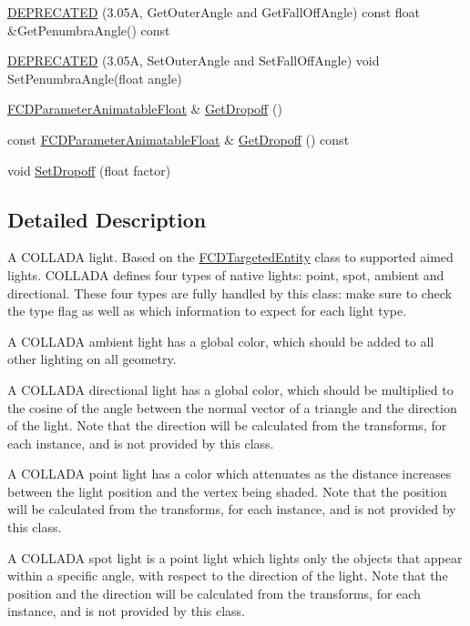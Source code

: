 \begin{DoxyCompactItemize}
\item 
\hyperlink{classFCDLight_a95d4f8b8d9b8f7d177405d1139ab346b}{DEPRECATED} (3.05A, GetOuterAngle and GetFallOffAngle) const float \&GetPenumbraAngle() const 
\item 
\hyperlink{classFCDLight_ad69a3aca5f0962c52c75d65bf51f55a5}{DEPRECATED} (3.05A, SetOuterAngle and SetFallOffAngle) void SetPenumbraAngle(float angle)
\item 
\hyperlink{classFCDParameterAnimatableT}{FCDParameterAnimatableFloat} \& \hyperlink{classFCDLight_ae532074b29738e69ef8e0bc73de993ad}{GetDropoff} ()
\item 
const \hyperlink{classFCDParameterAnimatableT}{FCDParameterAnimatableFloat} \& \hyperlink{classFCDLight_a11ea9829880b669586fde18745710649}{GetDropoff} () const 
\item 
void \hyperlink{classFCDLight_a78e8a5e5465c92226c41cc93e22652da}{SetDropoff} (float factor)
\end{DoxyCompactItemize}


\subsection{Detailed Description}
A COLLADA light. Based on the \hyperlink{classFCDTargetedEntity}{FCDTargetedEntity} class to supported aimed lights. COLLADA defines four types of native lights: point, spot, ambient and directional. These four types are fully handled by this class: make sure to check the type flag as well as which information to expect for each light type.

A COLLADA ambient light has a global color, which should be added to all other lighting on all geometry.

A COLLADA directional light has a global color, which should be multiplied to the cosine of the angle between the normal vector of a triangle and the direction of the light. Note that the direction will be calculated from the transforms, for each instance, and is not provided by this class.

A COLLADA point light has a color which attenuates as the distance increases between the light position and the vertex being shaded. Note that the position will be calculated from the transforms, for each instance, and is not provided by this class.

A COLLADA spot light is a point light which lights only the objects that appear within a specific angle, with respect to the direction of the light. Note that the position and the direction will be calculated from the transforms, for each instance, and is not provided by this class. 


